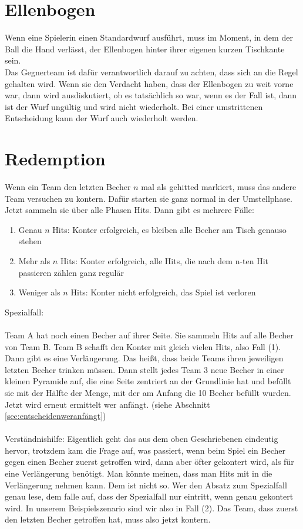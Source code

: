 \documentclass[a5paper, 12pt]{book}
\begin{document}
\section{Ellenbogen}\label{sec:ellenbogen}
Wenn eine Spielerin einen Standardwurf ausführt, muss im Moment, in dem der Ball die Hand verlässt, der Ellenbogen hinter ihrer eigenen kurzen Tischkante sein.\\
Das Gegnerteam ist dafür verantwortlich darauf zu achten, dass sich an die Regel gehalten wird. Wenn sie den Verdacht haben, dass der Ellenbogen zu weit vorne war, dann wird ausdiskutiert, ob es tatsächlich so war, wenn es der Fall ist, dann ist der Wurf ungültig und wird nicht wiederholt. Bei einer umstrittenen Entscheidung kann der Wurf auch wiederholt werden.

\section{Redemption}\label{sec:redemption}
Wenn ein Team den letzten Becher $n$ mal als gehitted markiert, muss das andere Team versuchen zu kontern. Dafür starten sie ganz normal in der Umstellphase. Jetzt sammeln sie über alle Phasen Hits. Dann gibt es mehrere Fälle:
\begin{enumerate}[(1)]
    \item Genau $n$ Hits: Konter erfolgreich, es bleiben alle Becher am Tisch genauso stehen
    \item Mehr als $n$ Hits: Konter erfolgreich, alle Hits, die nach dem n-ten Hit passieren zählen ganz regulär
    \item Weniger als $n$ Hits: Konter nicht erfolgreich, das Spiel ist verloren
\end{enumerate}
Spezialfall:\\\\
Team A hat noch einen Becher auf ihrer Seite. Sie sammeln Hits auf alle Becher von Team B. Team B schafft den Konter mit gleich vielen Hits, also Fall (1).\\
Dann gibt es eine Verlängerung. Das heißt, dass beide Teams ihren jeweiligen letzten Becher trinken müssen. Dann stellt jedes Team 3 neue Becher in einer kleinen Pyramide auf, die eine Seite zentriert an der Grundlinie hat und befüllt sie mit der Hälfte der Menge, mit der am Anfang die 10 Becher befüllt wurden. Jetzt wird erneut ermittelt wer anfängt. (siehe Abschnitt \ref{sec:entscheidenweranfängt})\\\\
Verständnishilfe: Eigentlich geht das aus dem oben Geschriebenen eindeutig hervor, trotzdem kam die Frage auf, was passiert, wenn beim Spiel ein Becher gegen einen Becher zuerst getroffen wird, dann aber öfter gekontert wird, als für eine Verlängerung benötigt. Man könnte meinen, dass man Hits mit in die Verlängerung nehmen kann. Dem ist nicht so. Wer den Absatz zum Spezialfall genau lese, dem falle auf, dass der Spezialfall nur eintritt, wenn genau gekontert wird. In unserem Beispielszenario sind wir also in Fall (2). Das Team, dass zuerst den letzten Becher getroffen hat, muss also jetzt kontern. 
\end{document}
